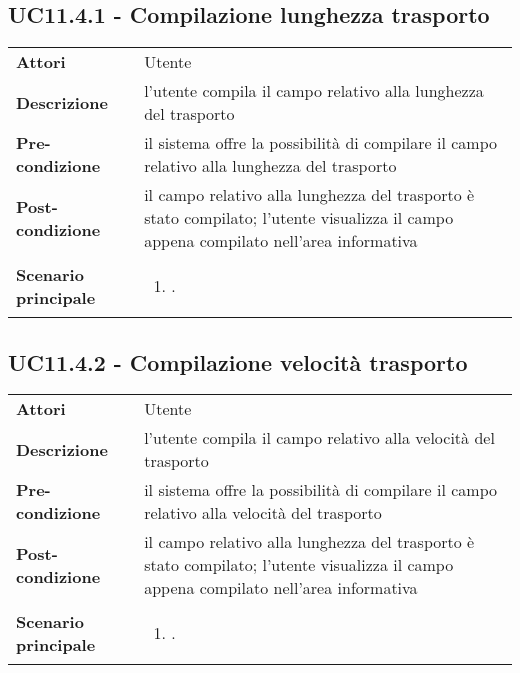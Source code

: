 \subsection{UC11.4.1 - Compilazione lunghezza trasporto} 
\label{sssec:UC11.4.1} 
\def\arraystretch{1.5}
\begin{tabularx}{\textwidth}{l|p{}}
	\rowcolor{I} \multicolumn{2}{c}{\color{white}\textbf{UC11.4.1 - Compilazione lunghezza trasporto}} \\
	\toprule
	\endhead
	\textbf{Attori} & Utente\\
	\textbf{Descrizione} & l'utente compila il campo relativo alla lunghezza del trasporto\\
	\textbf{Pre-condizione} & il sistema offre la possibilità di compilare il campo relativo alla lunghezza del trasporto\\
	\textbf{Post-condizione} & il campo relativo alla lunghezza del trasporto è stato compilato; l'utente visualizza il campo appena compilato nell'area informativa\\
	\textbf{Scenario principale} & \vspace{-1.2em}\begin{enumerate}[leftmargin=*,noitemsep,nosep]
		\item \nameref{sssec:UC11.4.1}.
	\end{enumerate}\\
	\bottomrule
\end{tabularx}
\subsection{UC11.4.2 - Compilazione velocità trasporto} 
\label{sssec:UC11.4.2} 
\def\arraystretch{1.5}
\begin{tabularx}{\textwidth}{l|p{}}
	\rowcolor{I} \multicolumn{2}{c}{\color{white}\textbf{UC11.4.2 - Compilazione velocità trasporto}} \\
	\toprule
	\endhead
	\textbf{Attori} & Utente\\
	\textbf{Descrizione} & l'utente compila il campo relativo alla velocità del trasporto\\
	\textbf{Pre-condizione} & il sistema offre la possibilità di compilare il campo relativo alla velocità del trasporto\\
	\textbf{Post-condizione} & il campo relativo alla lunghezza del trasporto è stato compilato; l'utente visualizza il campo appena compilato nell'area informativa\\
	\textbf{Scenario principale} & \vspace{-1.2em}\begin{enumerate}[leftmargin=*,noitemsep,nosep]
		\item \nameref{sssec:UC11.4.2}.
	\end{enumerate}\\
	\bottomrule
\end{tabularx}
